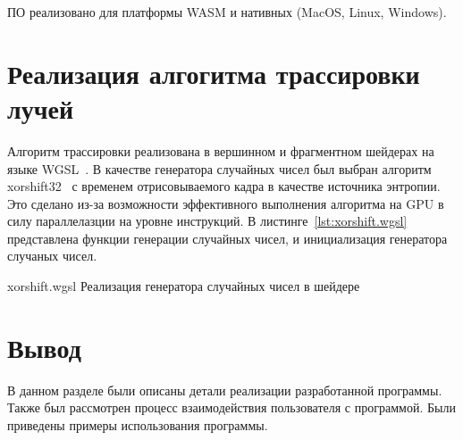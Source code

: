 ПО реализовано для платформы WASM и нативных (MacOS, Linux, Windows).

\section{Реализация алгогитма трассировки лучей}

Алгоритм трассировки реализована в 
вершинном и фрагментном шейдерах на языке WGSL~\cite{WebGPUSL}.
В качестве генератора случайных чисел был выбран алгоритм xorshift32~\cite{xorshift}
с временем отрисовываемого кадра в качестве источника энтропии. Это сделано
из-за возможности эффективного выполнения алгоритма на GPU в 
силу параллелазции на уровне инструкций. В листинге~\ref{lst:xorshift.wgsl} представлена 
функции генерации случайных чисел, и инициализация генератора случаных чисел.

    {xorshift.wgsl}
    {Реализация генератора случайных чисел в шейдере}

\section*{Вывод}

В данном разделе были описаны детали реализации разработанной программы. 
Также был рассмотрен процесс взаимодействия пользователя с программой.
Были приведены примеры использования программы.

